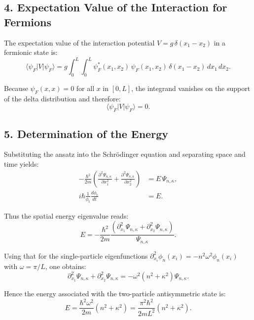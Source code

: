 \subsection*{4. Expectation Value of the Interaction for Fermions}

The expectation value of the interaction potential $V = g\,\delta(x_1 - x_2)$ in a fermionic state is:
\begin{equation}
    \langle \psi_F | V | \psi_F \rangle = g\int_{0}^{L}\int_{0}^{L} \psi_F^{*}(x_1, x_2)\,\psi_F(x_1, x_2)\,\delta(x_1 - x_2)\,dx_1\,dx_2.
\end{equation}

Because $\psi_F(x,x)=0$ for all $x$ in $[0,L]$, the integrand vanishes on the support of the delta distribution and therefore:
\begin{equation}
    \langle \psi_F | V | \psi_F \rangle = 0.
\end{equation}

\subsection*{5. Determination of the Energy}

Substituting the ansatz into the Schr\"odinger equation and separating space and time yields:
\begin{align}
    -\frac{\hbar^{2}}{2m}\left(\frac{\partial^{2}\Psi_{n,\kappa}}{\partial x_1^{2}} + \frac{\partial^{2}\Psi_{n,\kappa}}{\partial x_2^{2}}\right) &= E\,\Psi_{n,\kappa}, \\
    i\hbar \frac{1}{\phi_t}\frac{d\phi_t}{dt} &= E.
\end{align}

Thus the spatial energy eigenvalue reads:
\begin{equation}
    E = -\frac{\hbar^{2}}{2m}\frac{\left(\partial_{x_1}^{2}\Psi_{n,\kappa} + \partial_{x_2}^{2}\Psi_{n,\kappa}\right)}{\Psi_{n,\kappa}}.
\end{equation}

Using that for the single-particle eigenfunctions $\partial_{x_i}^{2}\phi_n(x_i) = -n^{2}\omega^{2}\phi_n(x_i)$ with $\omega = \pi/L$, one obtains:
\begin{equation}
    \partial_{x_1}^{2}\Psi_{n,\kappa} + \partial_{x_2}^{2}\Psi_{n,\kappa} = -\omega^{2}(n^{2} + \kappa^{2})\Psi_{n,\kappa}.
\end{equation}

Hence the energy associated with the two-particle antisymmetric state is:
\begin{equation}
    E = \frac{\hbar^{2}\omega^{2}}{2m}(n^{2} + \kappa^{2}) = \frac{\pi^{2}\hbar^{2}}{2mL^{2}}(n^{2} + \kappa^{2}).
\end{equation}

